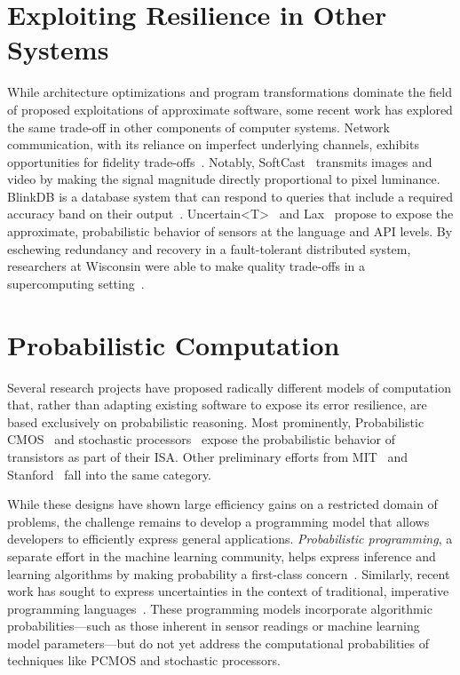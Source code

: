\section{Exploiting Resilience in Other Systems}

While architecture optimizations and program transformations dominate the
field of proposed exploitations of approximate software, some recent work has
explored the same trade-off in other components of computer systems. Network
communication, with its reliance on imperfect underlying channels, exhibits
opportunities for fidelity trade-offs~\cite{softcast, luo-globecom, apex,
smpmup2006}. Notably, SoftCast~\cite{softcast} transmits images and video by
making the signal magnitude directly proportional to pixel luminance. BlinkDB
is a database system that can respond to queries that include a required
accuracy band on their output~\cite{blinkdb}.
Uncertain{\textless}T{\textgreater}~\cite{uncertaint} and Lax~\cite{lax}
propose to expose the approximate, probabilistic behavior of sensors at the
language and API levels.
By eschewing redundancy and
recovery in a fault-tolerant distributed system, researchers at Wisconsin were
able to make quality trade-offs in a supercomputing
setting~\cite{dekruijf-icpp}.


\section{Probabilistic Computation}

Several research projects have proposed radically different models of
computation that, rather than adapting existing software to expose its error
resilience, are based exclusively on probabilistic reasoning. Most
prominently, Probabilistic CMOS~\cite{pcmos, pcmos-cacm, palem-dac-position}
and stochastic processors~\cite{stochasticproc} expose the probabilistic
behavior of transistors as part of their ISA.
Other preliminary efforts from MIT~\cite{batesmit, lyric, mansinghka-circuits} and
Stanford~\cite{ersa} fall into the same category.

While these designs have shown large efficiency gains on a restricted domain
of problems, the challenge remains to develop a programming model that allows
developers to efficiently express general applications. \emph{Probabilistic
programming}, a separate effort in the machine learning community, helps
express inference and learning algorithms by making probability a first-class
concern~\cite{church}. Similarly, recent work has sought to express
uncertainties in the context of traditional, imperative programming
languages~\cite{uncertaint}. These programming models incorporate algorithmic
probabilities---such as those inherent in sensor readings or machine learning
model parameters---but do not yet address the computational probabilities of
techniques like PCMOS and stochastic processors.


